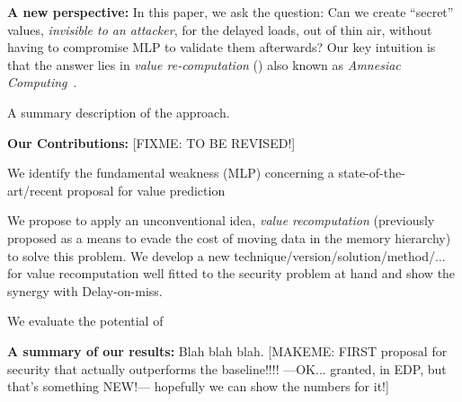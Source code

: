 \noindent \textbf{A new perspective:} In this paper, we ask the question: Can we create ``secret'' values, \emph{invisible to an attacker}, for the delayed loads, out of thin air, without having to compromise MLP to validate them afterwards? Our key intuition is that the answer lies in \emph{value re-computation} (\emph{\recomp})
also known as \emph{Amnesiac Computing}~\cite{amnesiac17}.

A summary description of the approach.

\noindent \textbf{Our Contributions:} {\color{red} [FIXME: TO BE REVISED!]}
\squishlist
\item We identify the fundamental weakness (MLP) concerning a state-of-the-art/recent proposal for value prediction 
\item We propose to apply an unconventional idea, \emph{value recomputation} (previously proposed as a means to evade the cost of moving data in the memory hierarchy) to solve this problem. We develop a new technique/version/solution/method/... for value recomputation well fitted to the security problem at hand and show the synergy with Delay-on-miss.
\item We evaluate the potential of \recomp\ 
\squishend

\noindent \textbf{A summary of our results:} Blah blah blah. {\color{red} [MAKEME: FIRST proposal for security that actually outperforms the baseline!!!! ---OK... granted, in EDP, but that's something NEW!--- hopefully we can show the numbers for it!]}






